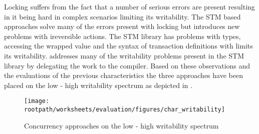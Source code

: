 Locking suffers from the fact that a number of serious errors are present resulting in it being hard in complex scenarios limiting its writability. The \ac{STM} based approaches solve many of the errors present with locking but introduces new problems with ireversible actions. The \ac{STM} library has problems with types, accessing the wrapped value and the syntax of transaction definitions with limits its writability. \stmname addresses many of the writability problems present in the \ac{STM} library by delegating the work to the compiler. Based on these observations and the evaluations of the previous characteristics the three approaches have been placed on the low - high writability spectrum as depicted in .

\begin{figure}[htbp]
\centering
 \texttt{[image: \\rootpath/worksheets/evaluation/figures/char\_writability]} 
 \caption{Concurrency approaches on the low - high writability spectrum}
\label{fig:char_tl_writability}
\end{figure}

\worksheetend
